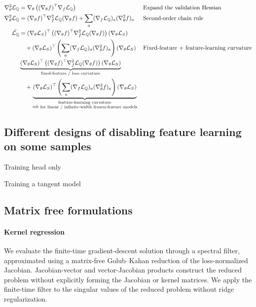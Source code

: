 \documentclass[10pt]{article} %
\newcommand{\genloss}{\mathcal{L}_{\sQ}}
\begin{document}
\begin{align}
    \nabla_\theta^2 \genloss
    &= \nabla_\theta
    \left(
        (\nabla_\theta f)^\top
        \nabla_f \genloss
    \right)
    && \text{Expand the validation Hessian} \\
    \nabla_\theta^2 \genloss
    &= (\nabla_\theta f)^\top
    \nabla_f^2 \genloss
    (\nabla_\theta f)
    +
    \sum_a
    (\nabla_f \genloss)_a
    (\nabla_\theta^2 f)_a
    && \text{Second-order chain rule} \\
    \ddot{\genloss}
    &= (\nabla_\theta \mathcal{L}_S)^\top
    \left(
        (\nabla_\theta f)^\top
        \nabla_f^2 \genloss
        (\nabla_\theta f)
    \right)
    (\nabla_\theta \mathcal{L}_S)
    \nonumber\\
    &\quad+
    (\nabla_\theta \mathcal{L}_S)^\top
    \left(
        \sum_a
        (\nabla_f \genloss)_a
        (\nabla_\theta^2 f)_a
    \right)
    (\nabla_\theta \mathcal{L}_S)
    && \text{Fixed-feature + feature-learning curvature} \\
    &\underbrace{
    (\nabla_\theta \mathcal{L}_S)^\top
    \left(
        (\nabla_\theta f)^\top
        \nabla_f^2 \genloss
        (\nabla_\theta f)
    \right)
    (\nabla_\theta \mathcal{L}_S)
    }_{\text{fixed-feature / loss curvature}}
    \nonumber\\
    &\quad+
    \underbrace{
    (\nabla_\theta \mathcal{L}_S)^\top
    \left(
        \sum_a
        (\nabla_f \genloss)_a
        (\nabla_\theta^2 f)_a
    \right)
    (\nabla_\theta \mathcal{L}_S)
    }_{\substack{\text{feature-learning curvature}\\
    \approx 0\ \text{for linear / infinite-width frozen-feature models}}}
    \nonumber
\end{align}

\subsection{Different designs of disabling feature learning on some samples}
\label{ap:disable-sample-feature-learning}

Training head only

Training a tangent model

\subsection{Matrix free formulations}
\label{ap:matrix-free}

\paragraph{Kernel regression}
We evaluate the finite-time gradient-descent solution through a spectral filter, approximated using a matrix-free Golub--Kahan reduction of the loss-normalized Jacobian. Jacobian-vector and vector-Jacobian products construct the reduced problem without explicitly forming the Jacobian or kernel matrices. We apply the finite-time filter to the singular values of the reduced problem without ridge regularization.
\end{document}

